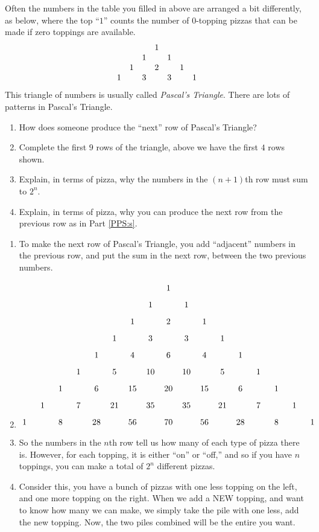 \documentclass[noauthor,nooutcomes,hints,handout]{ximera}
\begin{document}
\begin{question}
  Often the numbers in the table you filled in above are arranged a
  bit differently, as below, where the top ``$1$'' counts the number
  of $0$-topping pizzas that can be made if zero toppings are
  available.
  \[
  \begin{array}{c c c c c c c}
    &   &   & 1 &   &   &  \\
    &   & 1 &   & 1 &   &  \\
    & 1 &   & 2 &   & 1 &  \\
    1 &   & 3 &   & 3 &   & 1
  \end{array}
  \]
This triangle of numbers is usually called \textit{Pascal's
  Triangle}. There are lots of patterns in
Pascal's Triangle.
\begin{enumerate}
  \item\label{PPS:s} How does someone produce the ``next'' row of Pascal's
    Triangle? 
  \item Complete the first $9$ rows of the triangle, above we have the
    first $4$ rows shown.
  \item Explain, in terms of pizza, why the numbers in the $(n+1)$th row
    must sum to $2^n$.
  \item Explain, in terms of pizza, why you can produce the next row
    from the previous row as in Part \ref{PPS:s}.
\end{enumerate}
\begin{freeResponse}
  \begin{enumerate}
  \item To make the next row of Pascal's Triangle, you add
    ``adjacent'' numbers in the previous row, and put the sum in the
    next row, between the two previous numbers.
  \item
    \[%
    \begin{tikzpicture}
      \foreach \n in {0,...,8} {
        \foreach \k in {0,...,\n} {
          \node at ({1.5*(\k-\n/2)},-\n*.7) {\binomialCoefficient{\n}{\k}};
        }
      }
    \end{tikzpicture}
    \]
  \item So the numbers in the $n$th row tell us how many of each type
    of pizza there is. However, for each topping, it is either ``on''
    or ``off,'' and so if you have $n$ toppings, you can make a total
    of $2^n$ different pizzas.
  \item Consider this, you have a bunch of pizzas with one less
    topping on the left, and one more topping on the right. When we
    add a NEW topping, and want to know how many we can make, we
    simply take the pile with one less, add the new topping.  Now, the
    two piles combined will be the entire you want.

  \end{enumerate}
\end{freeResponse}
\end{question}
\end{document}
